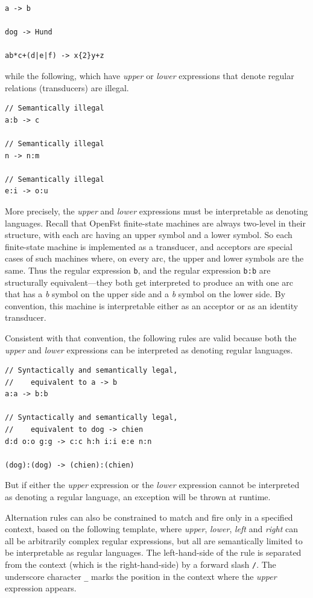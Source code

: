 \begin{Verbatim}
a -> b

dog -> Hund

ab*c+(d|e|f) -> x{2}y+z
\end{Verbatim}

\noindent
while the following, which have \emph{upper} or \emph{lower} expressions that denote regular relations
(transducers) are illegal.

\begin{Verbatim}
// Semantically illegal
a:b -> c

// Semantically illegal
n -> n:m

// Semantically illegal
e:i -> o:u
\end{Verbatim}


More precisely, the \emph{upper} and \emph{lower} expressions must be interpretable as denoting
languages.  Recall that OpenFst finite-state machines are always
two-level in their structure, with each arc having an
upper symbol and a lower symbol.  So each finite-state machine is implemented as a transducer, and
acceptors are special cases of such machines where, on every arc, the upper and lower symbols are the
same.  Thus the regular expression \texttt{b}, and the regular expression \texttt{b:b} are structurally
equivalent---they both get interpreted to produce an \fsm{} with one arc that has a \emph{b} symbol on
the upper side and a \emph{b} symbol on the lower side.  By convention,
this machine is interpretable either as an acceptor or as an identity
transducer.

Consistent with that convention, the following rules are valid because both the \emph{upper} and
\emph{lower} expressions can be interpreted as denoting regular
languages.

\begin{Verbatim}
// Syntactically and semantically legal, 
//    equivalent to a -> b
a:a -> b:b

// Syntactically and semantically legal, 
//    equivalent to dog -> chien
d:d o:o g:g -> c:c h:h i:i e:e n:n

(dog):(dog) -> (chien):(chien)
\end{Verbatim}

\noindent
But if either the \emph{upper} expression or the \emph{lower} expression cannot be interpreted as
denoting a regular language, an exception will be thrown at runtime.

Alternation rules can also be constrained to match and fire only in a specified context, based on the following
template, where \emph{upper}, \emph{lower}, \emph{left} and \emph{right} can all be arbitrarily complex regular
expressions, but all are semantically limited to be interpretable as regular languages.  The left-hand-side of the rule
is separated from the context (which is the right-hand-side) by a forward slash \texttt{/}. The underscore character
\texttt{\_} marks the position in the context where the \emph{upper} expression appears.
 

